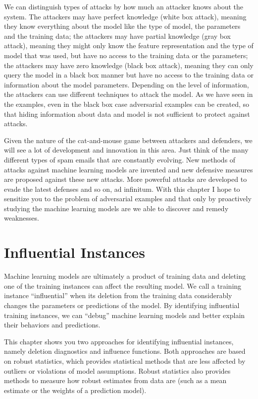 \documentclass[
  10pt,
]{scrbook}
\begin{document}
We can distinguish types of attacks by how much an attacker knows about the system.
The attackers may have perfect knowledge (white box attack), meaning they know everything about the model like the type of model, the parameters and the training data;
the attackers may have partial knowledge (gray box attack), meaning they might only know the feature representation and the type of model that was used, but have no access to the training data or the parameters;
the attackers may have zero knowledge (black box attack), meaning they can only query the model in a black box manner but have no access to the training data or information about the model parameters.
Depending on the level of information, the attackers can use different techniques to attack the model.
As we have seen in the examples, even in the black box case adversarial examples can be created, so that hiding information about data and model is not sufficient to protect against attacks.

Given the nature of the cat-and-mouse game between attackers and defenders, we will see a lot of development and innovation in this area.
Just think of the many different types of spam emails that are constantly evolving.
New methods of attacks against machine learning models are invented and new defensive measures are proposed against these new attacks.
More powerful attacks are developed to evade the latest defenses and so on, ad infinitum.
With this chapter I hope to sensitize you to the problem of adversarial examples and that only by proactively studying the machine learning models are we able to discover and remedy weaknesses.

\newpage

\hypertarget{influential}{%
\section{Influential Instances}\label{influential}}

Machine learning models are ultimately a product of training data and deleting one of the training instances can affect the resulting model.
We call a training instance ``influential'' when its deletion from the training data considerably changes the parameters or predictions of the model.
By identifying influential training instances, we can ``debug'' machine learning models and better explain their behaviors and predictions.

This chapter shows you two approaches for identifying influential instances, namely deletion diagnostics and influence functions.
Both approaches are based on robust statistics, which provides statistical methods that are less affected by outliers or violations of model assumptions.
Robust statistics also provides methods to measure how robust estimates from data are (such as a mean estimate or the weights of a prediction model).
\end{document}
